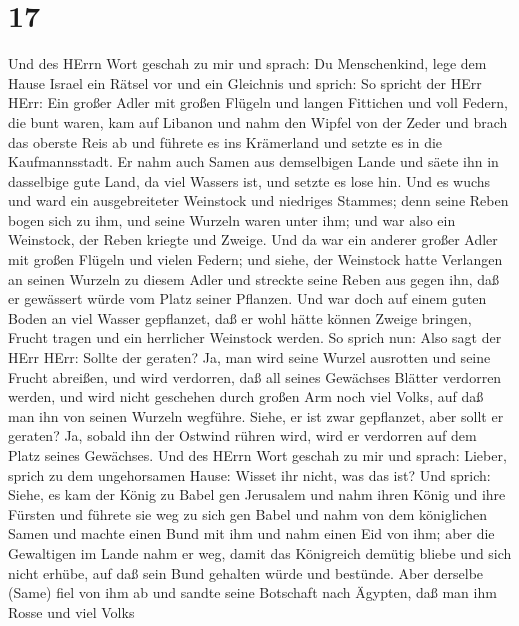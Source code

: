 \hypertarget{section-16}{%
\section{17}\label{section-16}}

 Und des HErrn Wort geschah zu mir und sprach: 
Du Menschenkind, lege dem Hause Israel ein Rätsel vor und ein Gleichnis
 und sprich: So spricht der HErr HErr: Ein großer Adler mit
großen Flügeln und langen Fittichen und voll Federn, die bunt waren, kam
auf Libanon und nahm den Wipfel von der Zeder  und brach das
oberste Reis ab und führete es ins Krämerland und setzte es in die
Kaufmannsstadt.  Er nahm auch Samen aus demselbigen Lande
und säete ihn in dasselbige gute Land, da viel Wassers ist, und setzte
es lose hin.  Und es wuchs und ward ein ausgebreiteter
Weinstock und niedriges Stammes; denn seine Reben bogen sich zu ihm, und
seine Wurzeln waren unter ihm; und war also ein Weinstock, der Reben
kriegte und Zweige.  Und da war ein anderer großer Adler mit
großen Flügeln und vielen Federn; und siehe, der Weinstock hatte
Verlangen an seinen Wurzeln zu diesem Adler und streckte seine Reben aus
gegen ihn, daß er gewässert würde vom Platz seiner Pflanzen.
 Und war doch auf einem guten Boden an viel Wasser
gepflanzet, daß er wohl hätte können Zweige bringen, Frucht tragen und
ein herrlicher Weinstock werden.  So sprich nun: Also sagt
der HErr HErr: Sollte der geraten? Ja, man wird seine Wurzel ausrotten
und seine Frucht abreißen, und wird verdorren, daß all seines Gewächses
Blätter verdorren werden, und wird nicht geschehen durch großen Arm noch
viel Volks, auf daß man ihn von seinen Wurzeln wegführe. 
Siehe, er ist zwar gepflanzet, aber sollt er geraten? Ja, sobald ihn der
Ostwind rühren wird, wird er verdorren auf dem Platz seines Gewächses.
 Und des HErrn Wort geschah zu mir und sprach:
 Lieber, sprich zu dem ungehorsamen Hause: Wisset ihr
nicht, was das ist? Und sprich: Siehe, es kam der König zu Babel gen
Jerusalem und nahm ihren König und ihre Fürsten und führete sie weg zu
sich gen Babel  und nahm von dem königlichen Samen und
machte einen Bund mit ihm und nahm einen Eid von ihm; aber die
Gewaltigen im Lande nahm er weg,  damit das Königreich
demütig bliebe und sich nicht erhübe, auf daß sein Bund gehalten würde
und bestünde.  Aber derselbe (Same) fiel von ihm ab und
sandte seine Botschaft nach Ägypten, daß man ihm Rosse und viel Volks
